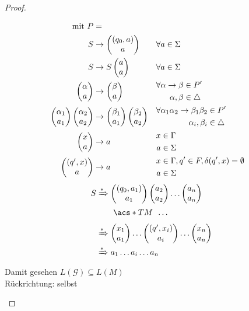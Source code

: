 \begin{proof}
\begin{itemize}
\begin{itemize}
	\end{itemize}
	\begin{align*}
		\text{mit } P &= \\
		S &\-> \pmqty{(q_0,a)\\a} &&\forall a\in\Sigma\\
		S &\-> S\pmqty{a\\a} &&\forall a\in\Sigma\\
		\pmqty{\alpha\\a}
			&\-> \pmqty{\beta\\a}
			&&\begin{aligned}
				\forall \alpha\->\beta &\in P'\\
				\alpha,\beta &\in\triangle
			\end{aligned}\\
		\pmqty{\alpha_1\\a_1}\pmqty{\alpha_2\\a_2}
			&\-> \pmqty{\beta_1\\a_1}\pmqty{\beta_2\\a_2}
			&&\begin{aligned}
				\forall \alpha_1\alpha_2\->\beta_1\beta_2 &\in P'\\
				\alpha_i,\beta_i &\in\triangle
			\end{aligned}\\
		\pmqty{x\\a} &\-> a
			&&\begin{aligned}
				x&\in\Gamma\\
				a&\in\Sigma
			\end{aligned}\\
		\pmqty{(q',x)\\a} &\-> a
			&&\begin{aligned}
				x&\in\Gamma, q'\in F, \delta (q',x)=\emptyset\\
				a&\in\Sigma
			\end{aligned}
	\end{align*}
	\begin{align*}
		S &\xRightarrow{*} \pmqty{(q_0,a_1)\\a_1}\pmqty{a_2\\a_2}\dots\pmqty{a_n\\a_n}\\
		&\phantom{{}\xRightarrow{*}{}}\ \acs*{TM}\ \,\dots\\
		&\xRightarrow{*} \pmqty{x_1\\a_1}\dots\pmqty{(q',x_i)\\a_i}\dots\pmqty{x_n\\a_n}\\
		&\xRightarrow{*} a_1\dots a_i\dots a_n
	\end{align*}
	Damit gesehen $L(\mathcal{G})\subseteq L(M)$\\
	Rückrichtung: selbst \qedhere
	\end{itemize}
\end{proof}


